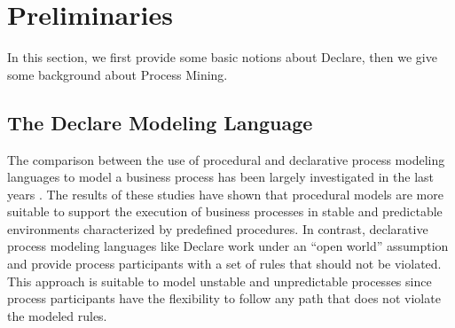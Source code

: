 \section{Preliminaries}
\label{sec:semantics}

In this section, we first provide some basic notions about Declare, then we give some background about Process Mining.

\subsection{The Declare Modeling Language}
\label{sec:declare}
The comparison between the use of procedural and declarative process modeling languages to model a business process has been largely investigated in the last years \cite{DBLP:conf/caise/ZugalPW11,DBLP:conf/bpm/PichlerWZPMR11,DBLP:conf/bpm/ReijersSS13}. The results of these studies have shown that procedural models are more suitable to support the execution of business processes in stable and predictable environments characterized by predefined procedures. In contrast, declarative process modeling languages like Declare work under an ``open world'' assumption and provide process participants with a set of rules that should not be violated. This approach is suitable to model unstable and unpredictable processes since process participants have the flexibility to follow any path that does not violate the modeled rules.

